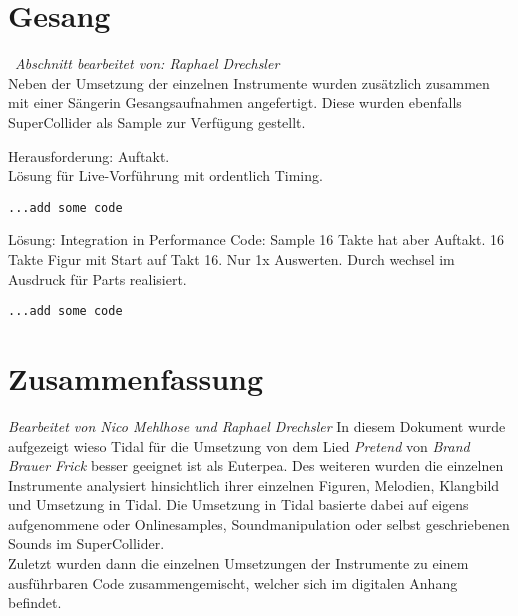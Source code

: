 \documentclass[
10pt, %
a4paper, %
oneside, %
headinclude,footinclude, %
BCOR5mm, %
]{scrartcl}
\begin{document}
\section{Gesang}\
\textit{Abschnitt bearbeitet von: Raphael Drechsler}\\

\noindent Neben der Umsetzung der einzelnen Instrumente wurden zusätzlich zusammen mit einer Sängerin Gesangsaufnahmen angefertigt. Diese wurden ebenfalls SuperCollider als Sample zur Verfügung gestellt. 

\noindent Herausforderung: Auftakt.\\
Lösung für Live-Vorführung mit ordentlich Timing.
\begin{lstlisting}
...add some code
\end{lstlisting}
Lösung: Integration in Performance Code: Sample 16 Takte hat aber Auftakt. 16 Takte Figur mit Start auf Takt 16. Nur 1x Auswerten. Durch wechsel im Ausdruck für Parts realisiert.
\begin{lstlisting}
...add some code
\end{lstlisting}

\section{Zusammenfassung}
\textit{Bearbeitet von Nico Mehlhose und Raphael Drechsler}
In diesem Dokument wurde aufgezeigt wieso Tidal für die Umsetzung von dem Lied \textit{Pretend} von \textit{Brand Brauer Frick} besser geeignet ist als Euterpea. Des weiteren wurden die einzelnen Instrumente analysiert hinsichtlich ihrer einzelnen Figuren, Melodien, Klangbild und Umsetzung in Tidal. Die Umsetzung in Tidal basierte dabei auf eigens aufgenommene oder Onlinesamples, Soundmanipulation oder selbst geschriebenen Sounds im SuperCollider.\\
Zuletzt wurden dann die einzelnen Umsetzungen der Instrumente zu einem ausführbaren Code zusammengemischt, welcher sich im digitalen Anhang befindet. 
\pagebreak







\renewcommand{\refname}{\spacedlowsmallcaps{Literatur/Quellen}} %




\end{document}
